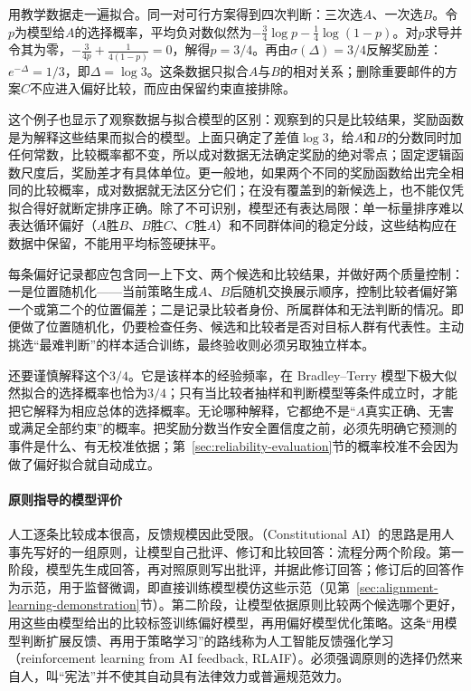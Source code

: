 用教学数据走一遍拟合。同一对可行方案得到四次判断：三次选$A$、一次选$B$。令$p$为模型给$A$的选择概率，平均负对数似然为$-\tfrac34\log p-\tfrac14\log(1-p)$。对$p$求导并令其为零，$-\tfrac{3}{4p}+\tfrac{1}{4(1-p)}=0$，解得$p=3/4$。再由$\sigma(\Delta)=3/4$反解奖励差：$e^{-\Delta}=1/3$，即$\Delta=\log3$。这条数据只拟合$A$与$B$的相对关系；删除重要邮件的方案$C$不应进入偏好比较，而应由保留约束直接排除。

这个例子也显示了观察数据与拟合模型的区别：观察到的只是比较结果，奖励函数是为解释这些结果而拟合的模型。上面只确定了差值$\log3$，给$A$和$B$的分数同时加任何常数，比较概率都不变，所以成对数据无法确定奖励的绝对零点；固定逻辑函数尺度后，奖励差才有具体单位。更一般地，如果两个不同的奖励函数给出完全相同的比较概率，成对数据就无法区分它们；在没有覆盖到的新候选上，也不能仅凭拟合得好就断定排序正确。除了不可识别，模型还有表达局限：单一标量排序难以表达循环偏好（$A$胜$B$、$B$胜$C$、$C$胜$A$）和不同群体间的稳定分歧，这些结构应在数据中保留，不能用平均标签硬抹平。

每条偏好记录都应包含同一上下文、两个候选和比较结果，并做好两个质量控制：一是位置随机化——当前策略生成$A$、$B$后随机交换展示顺序，控制比较者偏好第一个或第二个的位置偏差；二是记录比较者身份、所属群体和无法判断的情况。即便做了位置随机化，仍要检查任务、候选和比较者是否对目标人群有代表性。主动挑选“最难判断”的样本适合训练，最终验收则必须另取独立样本。

还要谨慎解释这个$3/4$。它是该样本的经验频率，在 Bradley--Terry 模型下极大似然拟合的选择概率也恰为$3/4$；只有当比较者抽样和判断模型等条件成立时，才能把它解释为相应总体的选择概率。无论哪种解释，它都绝不是“$A$真实正确、无害或满足全部约束”的概率。把奖励分数当作安全置信度之前，必须先明确它预测的事件是什么、有无校准依据；第~\ref{sec:reliability-evaluation}节的概率校准不会因为做了偏好拟合就自动成立。

\paragraph{原则指导的模型评价}

人工逐条比较成本很高，反馈规模因此受限。（Constitutional AI）的思路是用人事先写好的一组原则，让模型自己批评、修订和比较回答：流程分两个阶段。第一阶段，模型先生成回答，再对照原则写出批评，并据此修订回答；修订后的回答作为示范，用于监督微调，即直接训练模型模仿这些示范（见第~\ref{sec:alignment-learning-demonstration}节）。第二阶段，让模型依据原则比较两个候选哪个更好，用这些由模型给出的比较标签训练偏好模型，再用偏好模型优化策略。这条“用模型判断扩展反馈、再用于策略学习”的路线称为人工智能反馈强化学习（reinforcement learning from AI feedback, RLAIF）。必须强调原则的选择仍然来自人，叫“宪法”并不使其自动具有法律效力或普遍规范效力。

